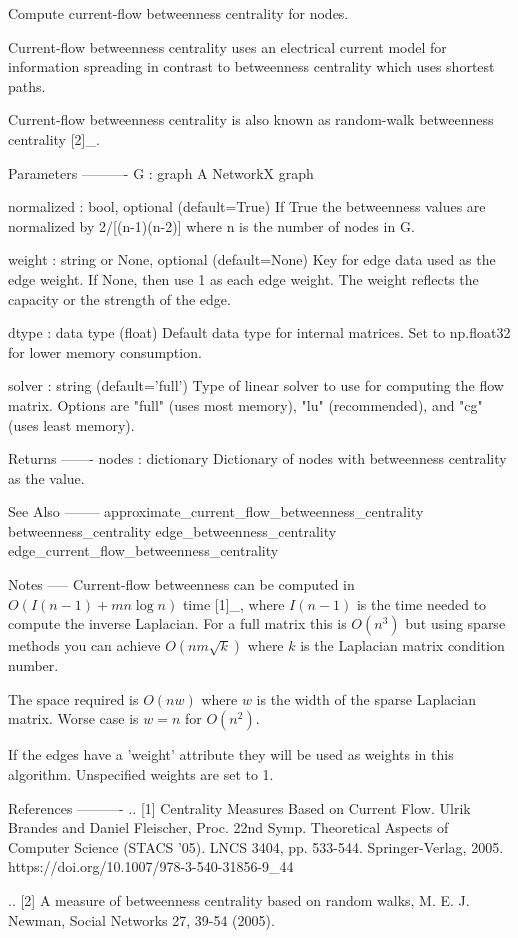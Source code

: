 \begin{DoxyVerb}Compute current-flow betweenness centrality for nodes.

Current-flow betweenness centrality uses an electrical current
model for information spreading in contrast to betweenness
centrality which uses shortest paths.

Current-flow betweenness centrality is also known as
random-walk betweenness centrality [2]_.

Parameters
----------
G : graph
  A NetworkX graph

normalized : bool, optional (default=True)
  If True the betweenness values are normalized by 2/[(n-1)(n-2)] where
  n is the number of nodes in G.

weight : string or None, optional (default=None)
  Key for edge data used as the edge weight.
  If None, then use 1 as each edge weight.
  The weight reflects the capacity or the strength of the
  edge.

dtype : data type (float)
  Default data type for internal matrices.
  Set to np.float32 for lower memory consumption.

solver : string (default='full')
   Type of linear solver to use for computing the flow matrix.
   Options are "full" (uses most memory), "lu" (recommended), and
   "cg" (uses least memory).

Returns
-------
nodes : dictionary
   Dictionary of nodes with betweenness centrality as the value.

See Also
--------
approximate_current_flow_betweenness_centrality
betweenness_centrality
edge_betweenness_centrality
edge_current_flow_betweenness_centrality

Notes
-----
Current-flow betweenness can be computed in  $O(I(n-1)+mn \log n)$
time [1]_, where $I(n-1)$ is the time needed to compute the
inverse Laplacian.  For a full matrix this is $O(n^3)$ but using
sparse methods you can achieve $O(nm{\sqrt k})$ where $k$ is the
Laplacian matrix condition number.

The space required is $O(nw)$ where $w$ is the width of the sparse
Laplacian matrix.  Worse case is $w=n$ for $O(n^2)$.

If the edges have a 'weight' attribute they will be used as
weights in this algorithm.  Unspecified weights are set to 1.

References
----------
.. [1] Centrality Measures Based on Current Flow.
   Ulrik Brandes and Daniel Fleischer,
   Proc. 22nd Symp. Theoretical Aspects of Computer Science (STACS '05).
   LNCS 3404, pp. 533-544. Springer-Verlag, 2005.
   https://doi.org/10.1007/978-3-540-31856-9_44

.. [2] A measure of betweenness centrality based on random walks,
   M. E. J. Newman, Social Networks 27, 39-54 (2005).
\end{DoxyVerb}
